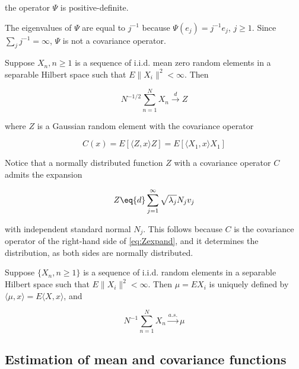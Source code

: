 the operator $\Psi$ is positive-definite.

The eigenvalues of $\Psi$ are equal to $j^{-1}$ because $\Psi(e_j) = j^{-1}e_j$, $j \geq 1$. Since $\sum_{j}j^{-1} = \infty$, $\Psi$ is not a covariance operator.

\begin{Theorem}
  Suppose ${X_n, n \geq 1}$ is a sequence of i.i.d. mean zero random elements in a separable Hilbert space such that $E\|X_i\|^2 < \infty$. Then

  \begin{equation}
    N^{-1/2}\sum_{n = 1}^{N}X_n \xrightarrow{d} Z
  \end{equation}
  
  where $Z$ is a Gaussian random element with the covariance operator

  \begin{equation}
    C(x) = E[\langle{}Z, x\rangle{} Z] = E[\langle{}X_1, x\rangle{} X_1]
  \end{equation}

\end{Theorem}

Notice that a normally distributed function $Z$ with a covariance operator $C$ admits the expansion

\begin{equation}
  Z \eq{d} \sum_{j = 1}^{\infty} \sqrt{\lambda_j} N_j v_j \label{eq:Zexpand}
\end{equation}

with independent standard normal $N_j$. This follows because $C$ is the covariance operator of the right-hand side of \ref{eq:Zexpand}, and it determines the distribution, as both sides are normally distributed.

\begin{Theorem}
  Suppose $\{ X_n, n \geq 1 \}$ is a sequence of i.i.d. random elements in a separable Hilbert space such that $E\| X_i \|^2 < \infty$. Then $\mu = EX_i$ is uniquely defined by $\langle{}\mu, x\rangle{} = E\langle{}X, x\rangle{}$, and

  \begin{equation}
    N^{-1}\sum_{n = 1}^{N}X_n \xrightarrow{a.s.} \mu
  \end{equation}

\end{Theorem}

\subsection{Estimation of mean and covariance functions}

